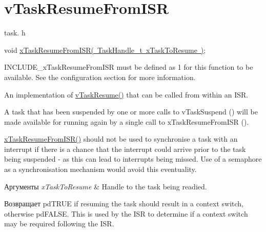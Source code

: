 \hypertarget{group__v_task_resume_from_i_s_r}{}\section{v\+Task\+Resume\+From\+I\+SR}
\label{group__v_task_resume_from_i_s_r}
task. h 
\begin{DoxyPre}void \mbox{\hyperlink{task_8h_aefbfd37c0661c3062fafd7334bff9aed}{xTaskResumeFromISR( TaskHandle\_t xTaskToResume )}};\end{DoxyPre}


I\+N\+C\+L\+U\+D\+E\+\_\+x\+Task\+Resume\+From\+I\+SR must be defined as 1 for this function to be available. See the configuration section for more information.

An implementation of \mbox{\hyperlink{task_8h_a84a1584f29fb7736a1aa72ad5b3e9b44}{v\+Task\+Resume()}} that can be called from within an I\+SR.

A task that has been suspended by one or more calls to v\+Task\+Suspend () will be made available for running again by a single call to x\+Task\+Resume\+From\+I\+SR ().

\mbox{\hyperlink{task_8h_aefbfd37c0661c3062fafd7334bff9aed}{x\+Task\+Resume\+From\+I\+S\+R()}} should not be used to synchronise a task with an interrupt if there is a chance that the interrupt could arrive prior to the task being suspended -\/ as this can lead to interrupts being missed. Use of a semaphore as a synchronisation mechanism would avoid this eventuality.


\begin{DoxyParams}{Аргументы}
{\em x\+Task\+To\+Resume} & Handle to the task being readied.\\
\hline
\end{DoxyParams}
\begin{DoxyReturn}{Возвращает}
pd\+T\+R\+UE if resuming the task should result in a context switch, otherwise pd\+F\+A\+L\+SE. This is used by the I\+SR to determine if a context switch may be required following the I\+SR. 
\end{DoxyReturn}
